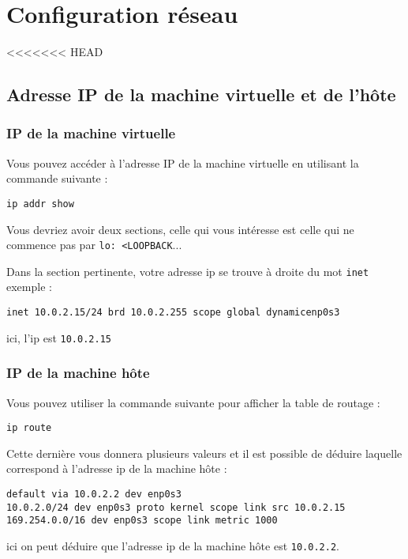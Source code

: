 \chapter{Configuration réseau}
<<<<<<< HEAD

\section{Adresse IP de la machine virtuelle et de l'hôte}

\subsection{IP de la machine virtuelle}

Vous pouvez accéder à l'adresse IP de la machine virtuelle en utilisant la commande suivante :

\begin{lstlisting}
ip addr show
\end{lstlisting}

Vous devriez avoir deux sections, celle qui vous intéresse est celle qui ne commence pas par \texttt{lo: <LOOPBACK}...

Dans la section pertinente, votre adresse ip se trouve à droite du mot \texttt{inet}\\

exemple : 
\begin{lstlisting}[style=tf]
inet 10.0.2.15/24 brd 10.0.2.255 scope global dynamicenp0s3
\end{lstlisting}
ici, l'ip est \texttt{10.0.2.15}

\subsection{IP de la machine hôte}
Vous pouvez utiliser la commande suivante pour afficher la table de routage :
\begin{lstlisting}
ip route
\end{lstlisting}
Cette dernière vous donnera plusieurs valeurs et il est possible de déduire laquelle correspond à l'adresse ip de la machine hôte :
\begin{lstlisting}[style=tf]
default via 10.0.2.2 dev enp0s3
10.0.2.0/24 dev enp0s3 proto kernel scope link src 10.0.2.15
169.254.0.0/16 dev enp0s3 scope link metric 1000
\end{lstlisting}
ici on peut déduire que l'adresse ip de la machine hôte est \texttt{10.0.2.2}.\\


